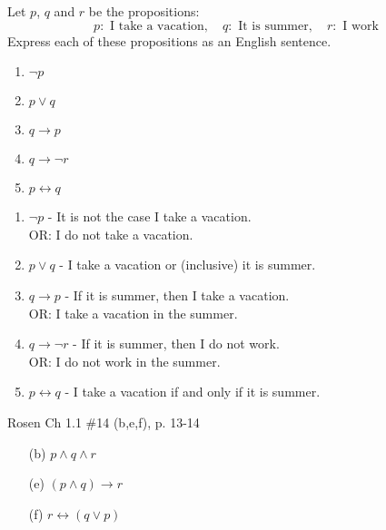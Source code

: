 \documentclass[12pt,addpoints]{exam}
\newcommand{\ra}{\rightarrow}
\newcommand{\lra}{\leftrightarrow}
\begin{document}
\begin{questions}
\question[10] Let $p$, $q$ and $r$ be the propositions:
    \[ p : \text{ I take a vacation}, \quad q : \text{ It is summer}, \quad r : \text{ I work} \]
    Express each of these propositions as an English sentence.
    \begin{enumerate}[label=(\alph*),itemsep=0pt,parsep=0pt,topsep=0pt,partopsep=0pt]
        \item $\neg p$
        \item $p \vee q$
        \item $q \ra p$
        \item $q \ra \neg r$
        \item $p \lra q$
    \end{enumerate}
    \ifprintanswers
        \vspace{-15pt}
    \fi
    \begin{solution}
    \begin{enumerate}[label=(\alph*),itemsep=0pt,parsep=0pt,topsep=0pt,partopsep=0pt]
        \item $\neg p$ - It is not the case I take a vacation. \\
        OR:  I do not take a vacation.
        \item $p \vee q$ - I take a vacation or (inclusive) it is summer.
        \item $q \ra p$  - If it is summer, then I take a vacation. \\
        OR: I take a vacation in the summer.
        \item $q \ra \neg r$ - If it is summer, then I do not work. \\
        OR: I do not work in the summer.
        \item $p \lra q$ - I take a vacation if and only if it is summer.
    \end{enumerate}
    \end{solution}


\question[6] Rosen Ch 1.1 \#14 (b,e,f), p. 13-14
    \ifprintanswers
        \vspace{-10pt}
    \fi
    \begin{solution}
        \begin{itemize}[itemsep=0pt,parsep=0pt,topsep=0pt,partopsep=0pt]
            \item[(b)] $p \wedge q \wedge r$
            \item[(e)] $(p \wedge q) \ra r$
            \item[(f)] $r \lra (q \vee p)$
        \end{itemize}
    \end{solution}



\end{questions}
\end{document}
